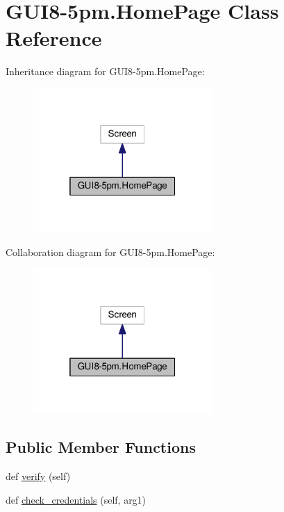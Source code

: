 \hypertarget{classGUI8-5pm_1_1HomePage}{}\section{G\+U\+I8-\/5pm.Home\+Page Class Reference}
\label{classGUI8-5pm_1_1HomePage}


Inheritance diagram for G\+U\+I8-\/5pm.Home\+Page\+:
\nopagebreak
\begin{figure}[H]
\begin{center}
\leavevmode
\includegraphics[width=193pt]{classGUI8-5pm_1_1HomePage__inherit__graph}
\end{center}
\end{figure}


Collaboration diagram for G\+U\+I8-\/5pm.Home\+Page\+:
\nopagebreak
\begin{figure}[H]
\begin{center}
\leavevmode
\includegraphics[width=193pt]{classGUI8-5pm_1_1HomePage__coll__graph}
\end{center}
\end{figure}
\subsection*{Public Member Functions}
\begin{DoxyCompactItemize}
\item 
def \hyperlink{classGUI8-5pm_1_1HomePage_a0f5b74437a5335f042b84f979131276a}{verify} (self)
\item 
def \hyperlink{classGUI8-5pm_1_1HomePage_ab49e98b3b43f3bef65b02fc2d067f616}{check\+\_\+credentials} (self, arg1)
\end{DoxyCompactItemize}
